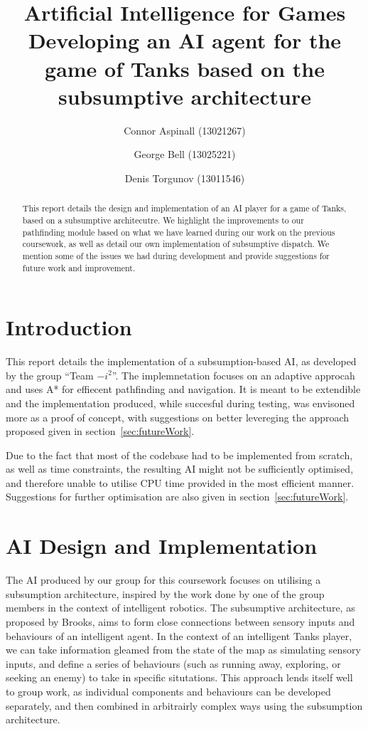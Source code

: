 \documentclass[11pt]{article}
\title{Artificial Intelligence for Games\\
Developing an AI agent for the game of Tanks based on the subsumptive architecture}
\author{Connor Aspinall (13021267) \and George Bell (13025221) \and Denis Torgunov (13011546)}
\date{}
\begin{document}
\newcommand{\includecode}[2][c]{<!---->}
\maketitle
\begin{abstract}
  This report details the design and implementation of an AI player for a game of Tanks, based on a subsumptive architecutre. We highlight the improvements to our pathfinding module based on what we have learned during our work on the previous coursework, as well as detail our own implementation of subsumptive dispatch. We mention some of the issues we had during development and provide suggestions for future work and improvement.
\end{abstract}
\tableofcontents
\thispagestyle{empty}

\newpage

\section{Introduction}
This report details the implementation of a subsumption-based AI, as developed by the group ``Team \(-i^2\)''. The implemnetation focuses on an adaptive approcah and uses A* for effiecent pathfinding and navigation. It is meant to be extendible and the implementation produced, while succesful during testing, was envisoned more as a proof of concept, with suggestions on better levereging the approach proposed given in section~\ref{sec:futureWork}.

Due to the fact that most of the codebase had to be implemented from scratch, as well as time constraints, the resulting AI might not be sufficiently optimised, and therefore unable to utilise CPU time provided in the most efficient manner. Suggestions for further optimisation are also given in section~\ref{sec:futureWork}.

\section{AI Design and Implementation} \label{sec:design}

The AI produced by our group for this coursework focuses on utilising a subsumption architecture, inspired by the work done by one of the group members in the context of intelligent robotics. The subsumptive architecture, as proposed by Brooks, aims to form close connections between sensory inputs and behaviours of an intelligent agent\cite{brooks1}. In the context of an intelligent Tanks player, we can take information gleamed from the state of the map as simulating sensory inputs, and define a series of behaviours (such as running away, exploring, or seeking an enemy) to take in specific situtations. This approach lends itself well to group work, as individual components and behaviours can be developed separately, and then combined in arbitrairly complex ways using the subsumption architecture.
\end{document}
